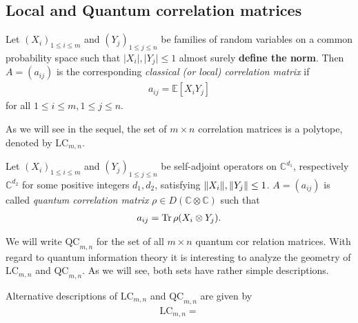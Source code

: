 \subsection{Local and Quantum correlation matrices}
\begin{dfn}
	Let $ (X_i)_{1 \le i \le m } $ and $ (Y_j)_{1 \le j \le n} $ be families of random variables on a common probability space such that $ \vert X_i \vert, \vert Y_j \vert \le 1 $ almost surely \textbf{define the norm}. Then $ A=(a_{ij}) $ is the corresponding {\itshape classical (or local) correlation matrix} if 
	\begin{align}
		a_{ij} = \mathbb{E}[X_iY_j]
	\end{align}
	for all $ 1 \le i \le m, 1 \le j \le n $.
\end{dfn}
As we will see in the sequel, the set of $ m \times n $ correlation matrices is a polytope, denoted by $ \text{LC}_{m,n} $.

\begin{dfn}
	Let $ (X_i)_{1 \le i \le m } $ and $ (Y_j)_{1 \le j \le n} $ be self-adjoint operators on $ \mathbb{C}^{d_1} $, respectively $ \mathbb{C}^{d_2} $ for some positive integers $ d_1,d_2 $, satisfying $  \Vert {X_i} \Vert,  \Vert {Y_j} \Vert \le 1 $. $ A = (a_{ij}) $ is called {\itshape quantum correlation matrix} $ \rho \in D(\mathbb{C} \otimes \mathbb{C})$ such that 
	\begin{align}
		a_{ij} = \text{Tr} \, {\rho (X_i \otimes Y_j)} .
	\end{align}
\end{dfn}
We will write $ \text{QC}_{m,n} $ for the set of all $ m \times n $ quantum cor relation matrices.
With regard to quantum information theory it is interesting to analyze the geometry of $ \text{LC}_{m,n} $ and $ \text{QC}_{m,n} $. As we will see, both sets have rather simple descriptions. 

\begin{lemma}
	Alternative descriptions of $ \text{LC}_{m,n} $ and $ \text{QC}_{m,n} $ are given by 
	\begin{align}
		\text{LC}_{m,n} =
	\end{align}
\end{lemma}
